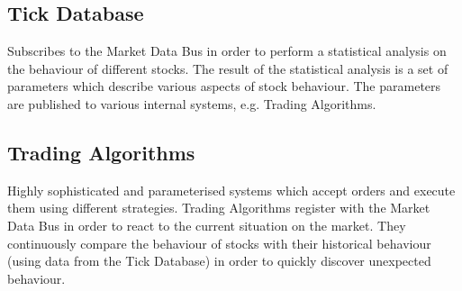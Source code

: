\subsection{Tick Database}
Subscribes to the Market Data Bus in order to perform a statistical analysis on the behaviour of different stocks. The result of the statistical analysis is a set of parameters which describe various aspects of stock behaviour. The parameters are published to various internal systems, e.g. Trading Algorithms.

\subsection{Trading Algorithms}
Highly sophisticated and parameterised systems which accept orders and execute them using different strategies. Trading Algorithms register with the Market Data Bus in order to react to the current situation on the market. They continuously compare the behaviour of stocks with their historical behaviour (using data from the Tick Database) in order to quickly discover unexpected behaviour. 
